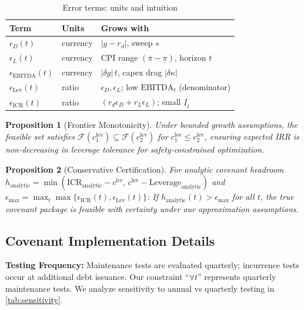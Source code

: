 \documentclass[11pt,a4paper]{article}
\newcommand{\EBITDA}{\mathrm{EBITDA}}
\theoremstyle{plain}
\newtheorem{proposition}{Proposition}
\theoremstyle{definition}
\newcommand{\cref}[1]{\ref{#1}}
\begin{document}
\begin{table}[h]
\centering
\caption{Error terms: units and intuition}
\begin{tabular}{lll}
\toprule
Term & Units & Grows with \\
\midrule
$\epsilon_D(t)$ & currency & $|g-r_d|$, sweep $s$ \\
$\epsilon_L(t)$ & currency & CPI range $(\overline{\pi}-\underline{\pi})$, horizon $t$ \\
$\epsilon_{\text{EBITDA}}(t)$ & currency & $|\delta g|\,t$, capex drag $|\delta\kappa|$ \\
$\epsilon_{\text{Lev}}(t)$ & ratio & $\epsilon_D,\epsilon_L$; low $\EBITDA_t$ (denominator) \\
$\epsilon_{\text{ICR}}(t)$ & ratio & $(r_d\epsilon_D+r_L\epsilon_L)$; small $\underline{I}_t$ \\
\bottomrule
\end{tabular}
\end{table}

\begin{proposition}[Frontier Monotonicity]\label{prop:frontier}
Under bounded growth assumptions, the feasible set satisfies $\mathcal{F}(c^{\text{lev}}_1)\subseteq \mathcal{F}(c^{\text{lev}}_2)$ for $c^{\text{lev}}_1\le c^{\text{lev}}_2$, ensuring expected IRR is non-decreasing in leverage tolerance for safety-constrained optimization.
\end{proposition}

\begin{proposition}[Conservative Certification]\label{prop:certification}
For analytic covenant headroom $h_{\text{analytic}}=\min(\text{ICR}_{\text{analytic}}-c^{\text{icr}},\, c^{\text{lev}}-\text{Leverage}_{\text{analytic}})$ and $\epsilon_{\max}=\max_t \max\{\epsilon_{\text{ICR}}(t),\epsilon_{\text{Lev}}(t)\}$:
If $h_{\text{analytic}}(t)>\epsilon_{\max}$ for all $t$, the true covenant package is feasible with certainty under our approximation assumptions.
\end{proposition}

\subsection{Covenant Implementation Details}

\textbf{Testing Frequency:} Maintenance tests are evaluated quarterly; incurrence tests occur at additional debt issuance. Our constraint ``$\forall t$'' represents quarterly maintenance tests. We analyze sensitivity to annual vs quarterly testing in \cref{tab:sensitivity}.
\end{document}
